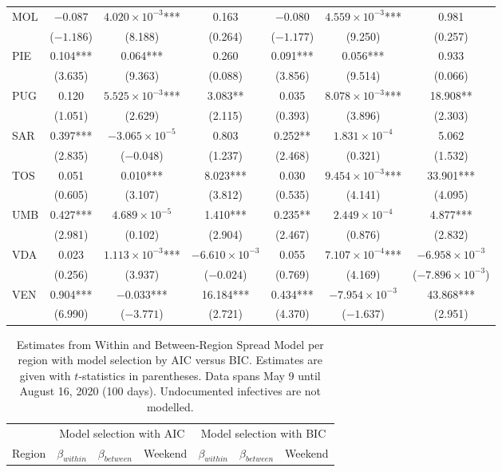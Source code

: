 \documentclass[12pt]{article}
\begin{document}
\begin{appendices}
\begin{longtable}{@{}lcccccc@{}}
            MOL & $-0.087$ & $4.020 \times 10^{-3}$*** & 0.163 & $-0.080$ & $4.559 \times 10^{-3}$*** & 0.981 \\ 
             & ($-1.186$) & (8.188) & (0.264) & ($-1.177$) & (9.250) & (0.257) \\ 
            PIE & 0.104*** & 0.064*** & 0.260 & 0.091*** & 0.056*** & 0.933 \\ 
             & (3.635) & (9.363) & (0.088) & (3.856) & (9.514) & (0.066) \\ 
            PUG & 0.120 & $5.525 \times 10^{-3}$*** & 3.083** & 0.035 & $8.078 \times 10^{-3}$*** & 18.908** \\ 
             & (1.051) & (2.629) & (2.115) & (0.393) & (3.896) & (2.303) \\ 
            SAR & 0.397*** & $-3.065 \times 10^{-5}$ & 0.803 & 0.252** & $1.831 \times 10^{-4}$ & 5.062 \\ 
             & (2.835) & ($-0.048$) & (1.237) & (2.468) & (0.321) & (1.532) \\ 
            TOS & 0.051 & 0.010*** & 8.023*** & 0.030 & $9.454 \times 10^{-3}$*** & 33.901*** \\ 
             & (0.605) & (3.107) & (3.812) & (0.535) & (4.141) & (4.095) \\ 
            UMB & 0.427*** & $4.689 \times 10^{-5}$ & 1.410*** & 0.235** & $2.449 \times 10^{-4}$ & 4.877*** \\ 
             & (2.981) & (0.102) & (2.904) & (2.467) & (0.876) & (2.832) \\ 
            VDA & 0.023 & $1.113 \times 10^{-3}$*** & $-6.610 \times 10^{-3}$ & 0.055 & $7.107 \times 10^{-4}$*** & $-6.958 \times 10^{-3}$ \\ 
             & (0.256) & (3.937) & ($-0.024$) & (0.769) & (4.169) & ($-7.896 \times 10^{-3}$) \\ 
            VEN & 0.904*** & $-0.033$*** & 16.184*** & 0.434*** & $-7.954 \times 10^{-3}$ & 43.868*** \\ 
             & (6.990) & ($-3.771$) & (2.721) & (4.370) & ($-1.637$) & (2.951) \\* \bottomrule
    	\end{longtable}
		
		\begin{longtable}{@{}lcccccc@{}}
    		\caption{Estimates from Within and Between-Region Spread Model per region with model selection by AIC versus BIC. Estimates are given with $t$-statistics in parentheses. Data spans May 9 until August 16, 2020 (100 days). Undocumented infectives are not modelled.}
    		\label{tab:results_within_between_aic_vs_bic}\\
    		\toprule
    		                & \multicolumn{3}{c}{Model selection with AIC} & \multicolumn{3}{c}{Model selection with BIC} \\
    		                \cmidrule(lr){2-4}
                            \cmidrule(lr){5-7}
    		Region          & $\beta_{within}$ & $\beta_{between}$ & Weekend & $\beta_{within}$ & $\beta_{between}$ & Weekend \\* \midrule
    		\endfirsthead
    		

\end{longtable}
\end{appendices}
\end{document}
